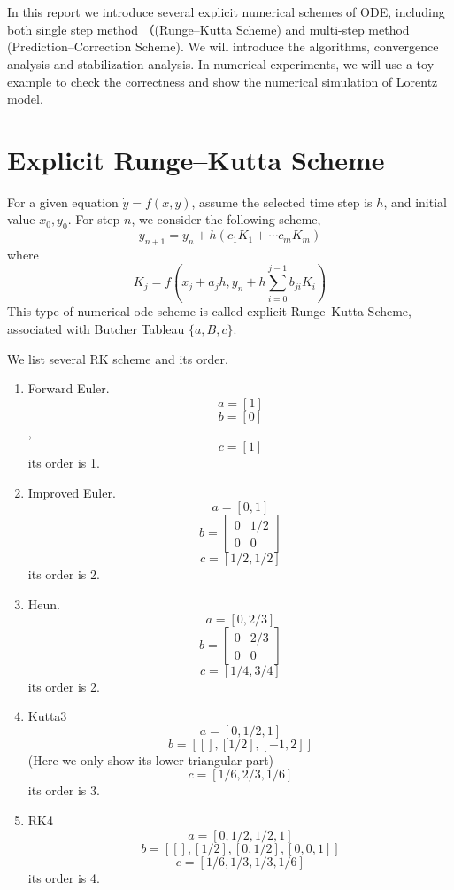 \documentclass{article}
\begin{document}
	\maketitle
	\thispagestyle{fancy}
	\tableofcontents
	
	\section*{}

In this report we introduce several explicit numerical schemes of ODE, including both single step method （(Runge--Kutta Scheme) and multi-step method (Prediction--Correction Scheme). We will introduce the algorithms, convergence analysis and stabilization analysis. In numerical experiments, we will use a toy example to check the correctness and show the numerical simulation of Lorentz model.

\section{Explicit Runge--Kutta Scheme}
For a given equation $\dot{y} = f(x,y)$, assume the selected time step is $h$, and initial value $x_0, y_0$. For step $n$,
we consider the following scheme, 
\begin{equation}
y_{n+1} = y_n + h(c_1K_1 + \cdots c_mK_m)
\end{equation}
where 
$$K_j = f(x_j + a_jh, y_n + h\sum_{i=0}^{j-1}b_{ji}K_i)$$
This type of numerical ode scheme is called explicit Runge--Kutta Scheme, associated with Butcher Tableau $\{a, B, c\}$.

We list several RK scheme and its order. 
\begin{enumerate}
	\item Forward Euler. $$a = [1]$$
	$$b = [0]$$, $$c = [1]$$
	its order is 1.
	\item Improved Euler. 
	$$a = [0, 1]$$
	$$b = \begin{bmatrix}
	0&1/2\\0&0
	\end{bmatrix}$$
	$$c = [1/2,1/2]$$
	its order is 2.
	\item Heun.
	$$a = [0, 2/3]$$
	$$b = \begin{bmatrix}
0&2/3\\0&0
\end{bmatrix}$$
$$ c = [1/4,3/4]$$
its order is 2.
	\item Kutta3
	$$ a = [0,1/2,1]$$
	$$b = [[], [1/2], [-1,2]]$$ (Here we only show its lower-triangular part)
	$$c = [1/6,2/3,1/6]$$
	its order is 3.
	\item RK4
	$$a = [0,1/2,1/2,1]$$
	$$b = [[],[1/2],[0,1/2],[0,0,1]]$$
	$$c = [1/6,1/3,1/3,1/6]$$
	its order is 4.
\end{enumerate}
\end{document}
